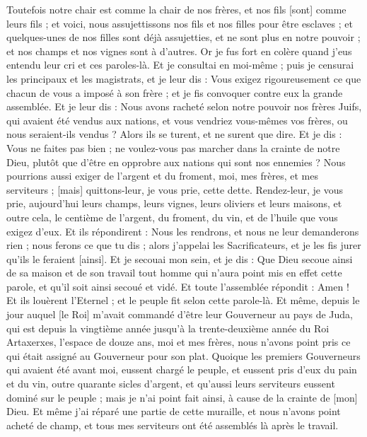 \begin{multicols}{2}
{Toutefois notre chair est comme la chair de nos frères, et nos fils [sont] comme leurs fils ; et voici, nous assujettissons nos fils et nos filles pour être esclaves ; et quelques-unes de nos filles sont déjà assujetties, et ne sont plus en notre pouvoir ; et nos champs et nos vignes sont à d'autres.
Or je fus fort en colère quand j'eus entendu leur cri et ces paroles-là.
Et je consultai en moi-même ; puis je censurai les principaux et les magistrats, et je leur dis : Vous exigez rigoureusement ce que chacun de vous a imposé à son frère ; et je fis convoquer contre eux la grande assemblée.
Et je leur dis : Nous avons racheté selon notre pouvoir nos frères Juifs, qui avaient été vendus aux nations, et vous vendriez vous-mêmes vos frères, ou nous seraient-ils vendus ? Alors ils se turent, et ne surent que dire.
Et je dis : Vous ne faites pas bien ; ne voulez-vous pas marcher dans la crainte de notre Dieu, plutôt que d'être en opprobre aux nations qui sont nos ennemies ?
Nous pourrions aussi exiger de l'argent et du froment, moi, mes frères, et mes serviteurs ; [mais] quittons-leur, je vous prie, cette dette.
Rendez-leur, je vous prie, aujourd'hui leurs champs, leurs vignes, leurs oliviers et leurs maisons, et outre cela, le centième de l'argent, du froment, du vin, et de l'huile que vous exigez d'eux.
Et ils répondirent : Nous les rendrons, et nous ne leur demanderons rien ; nous ferons ce que tu dis ; alors j'appelai les Sacrificateurs, et je les fis jurer qu'ils le feraient [ainsi].
Et je secouai mon sein, et je dis : Que Dieu secoue ainsi de sa maison et de son travail tout homme qui n'aura point mis en effet cette parole, et qu'il soit ainsi secoué et vidé. Et toute l'assemblée répondit : Amen ! Et ils louèrent l'Eternel ; et le peuple fit selon cette parole-là.
Et même, depuis le jour auquel [le Roi] m'avait commandé d'être leur Gouverneur au pays de Juda, qui est depuis la vingtième année jusqu'à la trente-deuxième année du Roi Artaxerxes, l'espace de douze ans, moi et mes frères, nous n'avons point pris ce qui était assigné au Gouverneur pour son plat.
Quoique les premiers Gouverneurs qui avaient été avant moi, eussent chargé le peuple, et eussent pris d'eux du pain et du vin, outre quarante sicles d'argent, et qu'aussi leurs serviteurs eussent dominé sur le peuple ; mais je n'ai point fait ainsi, à cause de la crainte de [mon] Dieu.
Et même j'ai réparé une partie de cette muraille, et nous n'avons point acheté de champ, et tous mes serviteurs ont été assemblés là après le travail.
}
\end{multicols}

